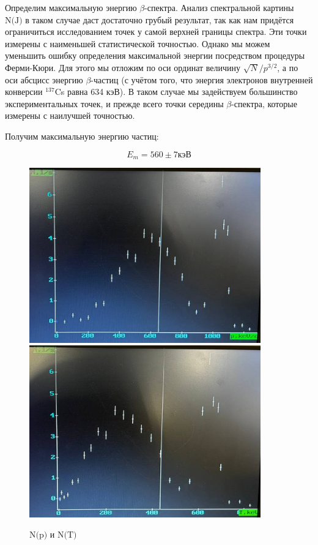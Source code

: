 \documentclass[a4paper, 12pt]{article}
\begin{document}
		Определим максимальную энергию $\beta$-спектра. Анализ спектральной картины $\text{N(J)}$ в таком случае даст достаточно грубый результат, так как нам придётся ограничиться исследованием точек у самой верхней границы спектра. Эти точки измерены с наименьшей статистической точностью. Однако мы можем уменьшить ошибку определения максимальной энергии посредством процедуры Ферми-Кюри. Для этого мы отложим по оси ординат величину $\sqrt{N}/p^{3/2}$, а по оси абсцисс энергию $\beta$-частиц (с учётом того, что энергия электронов внутренней конверсии $^{137}$Cs равна 634 кэВ). В таком случае мы задействуем большинство экспериментальных точек, и прежде всего точки середины $\beta$-спектра, которые измерены с наилучшей точностью.
		
		Получим максимальную энергию частиц:
		
		\[E_{m} = 560\pm 7 \text{кэВ}\]
		
		
	
        \begin{figure}[h]
		\centering
            \includegraphics[width=10cm]{p.png}
            \includegraphics[width=10cm]{T.png}
            \caption{$\text{N(p)}$ и $\text{N(T)}$}
        \end{figure}
\end{document}
